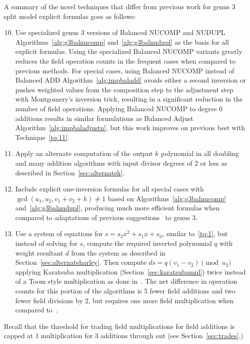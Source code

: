 A summary of the novel techniques that differ from previous work for genus 3
split model explicit formulas goes as follows:
\begin{enumerate}[label=T\arabic*] \setcounter{enumi}{9}
\item \label{tq:10} Use specialized genus 3 versions of Balanced NUCOMP and
NUDUPL Algorithms~\ref{alg:g3balnucomp} and~\ref{alg:g3balnudupl} as the basis
for all explicit formulas. Using the specialized Balanced NUCOMP variants
greatly reduces the field operation counts in the frequent cases when compared
to previous methods. For special cases, using Balanced NUCOMP instead of
Balanced ADD Algorithm~\ref{alg:impbaladd}  avoids either a second inversion or
pushes weighted values from the composition step to the adjustment step with
Montgomery's inversion trick, resulting in a significant reduction in the number
of field operations. Applying Balanced NUCOMP to degree 0 additions results in
similar formulations as Balanced Adjust Algorithm~\ref{alg:impbaladjustn}, but
this work improves on previous best with Technique~\ref{tq:11}.
\item \label{tq:11} Apply an alternate computation of the output $k$ polynomial
in all doubling and many addition algorithms with input divisor degrees of 2 or
less as described in Section~\ref{sec:alternatek}.
\item \label{tq:12} Include explicit one-inversion formulas for all special
cases with $\gcd (u_1,u_2,v_1 + v_2 + h) \not = 1$  based on
Algorithms~\ref{alg:g3balnucomp} and~\ref{alg:g3balnudupl}, producing much more
efficient formulas when compared to adaptations of previous
suggestions~\cite{EricksonJacobsonStein_realg2_2011} to genus 3.
\item \label{tq:13} Use a system of equations for $s=s_2x^2 + s_1x + s_0$,
similar to~\ref{tq:1}, but instead of solving for $s$, compute the required
inverted polynomial $q$ with weight resultant $d$ from the system as described
in Section~\ref{sec:alternateharley}. Then compute $ds = q(v_1 - v_2)
\pmod{u_2}$ applying Karatsuba multiplication (Section~\ref{sec:karatsubamul})
twice instead of a Toom style multiplication as done
in~\cite{Sutherland_g3_2019}. The net difference in operation counts for this
portion of the algorithms is 5 fewer field additions and two fewer field divisions by
2, but requires one more field multiplication when compared to~\cite{Sutherland_g3_2019}.
\end{enumerate}

Recall that the threshold for trading field multiplications for field additions
is capped at 1 multiplication for 3 additions through out (see
Section~\ref{sec:trades}.)


